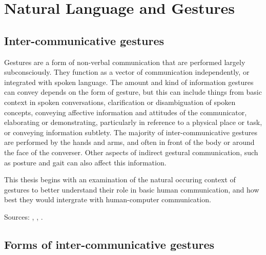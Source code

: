 \chapter{Natural Language and Gestures}
\label{cha:natural}


\section{Inter-communicative gestures}
\label{sec:natural-intercom}


Gestures are a form of non-verbal communication that are performed largely subconsciously. They function as a vector of communication independently, or integrated with spoken language. The amount and kind of information gestures can convey depends on the form of gesture, but this can include things from basic context in spoken conversations, clarification or disambiguation of spoken concepts, conveying affective information and attitudes of the communicator, elaborating or demonstrating, particularly in reference to a physical place or task, or conveying information subtlety. The majority of inter-communicative gestures are performed by the hands and arms, and often in front of the body or around the face of the converser. Other aspects of indirect gestural communication, such as posture and gait can also affect this information.

This thesis begins with an examination of the natural occuring context of gestures to better understand their role in basic human communication, and how best they would intergrate with human-computer communication.

Sources: \cite{Argyle1988}, \cite{KnappHall2010}, \cite{Cassell1998}.

\begin{todoenv}

\end{todoenv}

\section{Forms of inter-communicative gestures}
\label{subsec:natural-forms}

